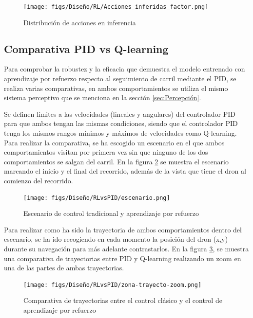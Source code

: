 \begin{figure} [H]
  \begin{center}
    \texttt{[image: figs/Diseño/RL/Acciones\_inferidas\_factor.png]}
  \end{center}
  \caption{Distribución de acciones en inferencia}
  \label{fig:inferencia_factor}
\end{figure}

\subsection{Comparativa PID vs Q-learning}
\label{sec:Análisis y comparativa entre el seguiento de carril clásico}
Para comprobar la robustez y la eficacia que demuestra el modelo entrenado con aprendizaje por refuerzo respecto al seguimiento de carril mediante el PID, se realiza varias comparativas, en ambos
comportamientos se utiliza el mismo sistema perceptivo que se menciona en la sección \ref{sec:Percepción}. 

Se definen límites a las velocidades (lineales y angulares) del controlador PID para que ambos tengan las mismas condiciones, siendo que el controlador PID tenga los mismos 
rangos mínimos y máximos de velocidades como Q-learning. Para realizar la comparativa, se ha escogido un escenario en el que ambos comportamientos visitan por primera vez 
sin que ninguno de los dos comportamientos se salgan del carril. En la figura \ref{fig:escenario-comparativa} se muestra el escenario marcando el inicio 
y el final del recorrido, además de la vista que tiene el dron al comienzo del recorrido.


\begin{figure} [H]
  \begin{center}
    \texttt{[image: figs/Diseño/RLvsPID/escenario.png]}
  \end{center}
  \caption{Escenario de control tradicional y aprendizaje por refuerzo}
  \label{fig:escenario-comparativa}
\end{figure}

Para realizar como ha sido la trayectoria de ambos comportamientos dentro del escenario, se ha ido recogiendo en cada momento la posición del dron (x,y) durante su navegación
 para más adelante contrastarlos. En la figura \ref{fig:Comparativa-de-trayectorias}, se muestra una comparativa de trayectorias entre PID y Q-learning 
realizando un zoom en una de las partes de ambas 
trayectorias.

\begin{figure}[H]
  \centering
  \begin{minipage}{0.65\textwidth}
    \texttt{[image: figs/Diseño/RLvsPID/zona-trayecto-zoom.png]}
  \end{minipage}
  \caption{Comparativa de trayectorias entre el control clásico y el control de aprendizaje por refuerzo}
  \label{fig:Comparativa-de-trayectorias}
  \vspace{-1.5em}
\end{figure}

